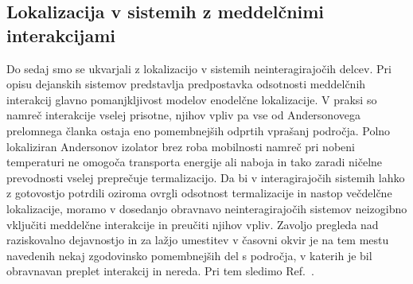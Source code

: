 \documentclass[10pt,a4paper]{article}
\begin{document}
\subsection{Lokalizacija v sistemih z meddelčnimi interakcijami}
Do sedaj smo se ukvarjali z lokalizacijo v sistemih neinteragirajočih delcev. Pri opisu dejanskih sistemov predstavlja predpostavka odsotnosti meddelčnih interakcij glavno pomanjkljivost modelov enodelčne lokalizacije. V praksi so namreč interakcije vselej prisotne, njihov vpliv pa vse od Andersonovega prelomnega članka ostaja eno pomembnejših odprtih vprašanj področja. Polno lokaliziran Andersonov izolator brez roba mobilnosti namreč pri nobeni temperaturi ne omogoča transporta energije ali naboja in tako zaradi ničelne prevodnosti vselej preprečuje termalizacijo. Da bi v interagirajočih sistemih lahko z gotovostjo potrdili oziroma ovrgli odsotnost termalizacije in nastop večdelčne lokalizacije, moramo v dosedanjo obravnavo neinteragirajočih sistemov neizogibno vključiti meddelčne interakcije in preučiti njihov vpliv. Zavoljo pregleda nad raziskovalno dejavnostjo in za lažjo umestitev v časovni okvir je na tem mestu navedenih nekaj zgodovinsko pomembnejših del s področja, v katerih je bil obravnavan preplet interakcij in nereda. Pri tem sledimo Ref.~\cite{abanin2018ergodicity}.\\\\
\end{document}
